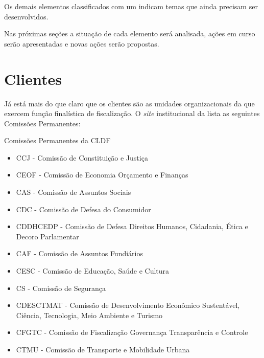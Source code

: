     Os demais elementos classificados com um \mschecknao \xspace indicam temas que ainda precisam ser desenvolvidos.
    
    Nas próximas seções a situação de cada elemento será analisada, ações em curso serão apresentadas e novas ações serão propostas.
    
    \section{Clientes}
    
    \begin{env-cenario2}{}
        \mschecksim \xspace \CLIENTES 
    \end{env-cenario2}
    
    Já está mais do que claro que os clientes são as unidades organizacionais da \CLDF que exercem função finalística de fiscalização.    O \emph{site} institucional da \CLDF \cite{site:cldf:comissoes} lista as seguintes Comissões Permanentes:
    
    \begin{env-destaque}{Comissões Permanentes da CLDF}
    \begin{itemize}
        \item CCJ - Comissão de Constituição e Justiça
        \item CEOF - Comissão de Economia Orçamento e Finanças
        \item CAS - Comissão de Assuntos Sociais
        \item CDC - Comissão de Defesa do Consumidor
        \item CDDHCEDP - Comissão de Defesa Direitos Humanos, Cidadania, Ética e Decoro Parlamentar
        \item CAF - Comissão de Assuntos Fundiários
        \item CESC - Comissão de Educação, Saúde e Cultura
        \item CS - Comissão de Segurança
        \item CDESCTMAT - Comissão de Desenvolvimento Econômico Sustentável, Ciência, Tecnologia, Meio Ambiente e Turismo
        \item CFGTC - Comissão de Fiscalização Governança Transparência e Controle
        \item CTMU - Comissão de Transporte e Mobilidade Urbana
    \end{itemize}
    \end{env-destaque}

    
